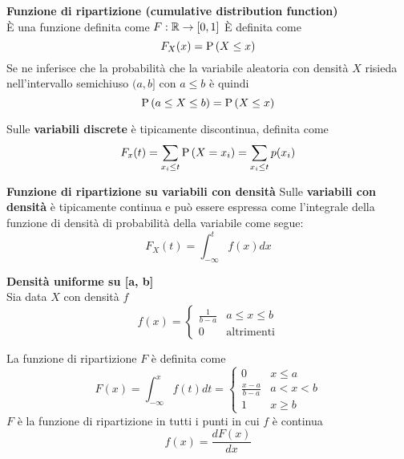 \begin{defn}
    \textbf{Funzione di ripartizione (cumulative distribution function)} \\
    È una funzione definita come $ F : \mathbb{R} \to [0,1]$
    È definita come
    \begin{equation}
        F_X(x) = \text{P}\left(X \leq x\right)
    \end{equation}
    Se ne inferisce che la probabilità che la variabile aleatoria con densità $ X $
    risieda nell'intervallo semichiuso $(a,b]$ con $ a \leq b $ è quindi
    \begin{equation}
        \text{P}\left(a \leq X \leq b\right) = \text{P}\left(X \leq x\right)
    \end{equation}

    Sulle \textbf{variabili discrete} è tipicamente discontinua, definita come
    \begin{equation}
        F_x(t) = \sum_{x_i \leq t} \text{P}\left(X = x_i\right) = \sum_{x_i \leq t} p(x_i)
    \end{equation}

    \textbf{Funzione di ripartizione su variabili con densità}
    Sulle \textbf{variabili con densità} è tipicamente continua e può essere espressa come
    l'integrale della funzione di densità di probabilità della variabile come segue:
    \begin{equation}
        F_X(t) = \int_{-\infty}^{t} f(x) dx
    \end{equation}
\end{defn}

\begin{exmp}
    \textbf{Densità uniforme su [a, b]} \\
    Sia data $ X $ con densità $ f $
    \begin{equation*}
        f(x) = \begin{cases}
            \frac{1}{b-a} & a \leq x \leq b \\
            0   &    \text{altrimenti}
        \end{cases}
    \end{equation*}

    La funzione di ripartizione $F$ è definita come
    \begin{equation*}
        F(x) = \int_{-\infty}^x f(t) dt = \begin{cases}
            0 & x \leq a \\
            \frac{x-a}{b-a} & a < x < b \\
            1 & x \geq b
        \end{cases}
    \end{equation*}
    $ F $ è la funzione di ripartizione in tutti i punti in cui $ f $ è continua
    \begin{equation*}
        f(x) = \frac{dF(x)}{dx}
    \end{equation*}
\end{exmp}

